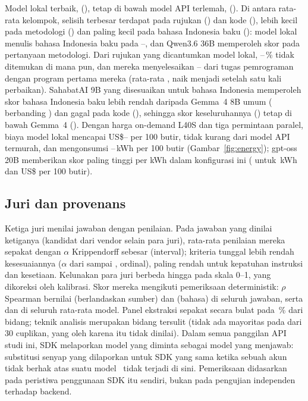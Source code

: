 Model lokal terbaik, \BestLocalName{} (\BestLocalScore{}), tetap di bawah model API terlemah, \WorstApiName{} (\WorstApiScore{}). Di antara rata-rata kelompok, selisih terbesar terdapat pada rujukan (\GapRef{}) dan kode (\GapCode{}), lebih kecil pada metodologi (\GapMeth{}) dan paling kecil pada bahasa Indonesia baku (\GapLang{}): model lokal menulis bahasa Indonesia baku pada \LocLangMin{}--\LocLangMax{}, dan Qwen3.6 36B memperoleh skor \TMethodologyQwenThreeSix{} pada pertanyaan metodologi. Dari rujukan yang dicantumkan model lokal, \NoneLocMin{}--\NoneLocMax{}\,\% tidak ditemukan di mana pun, dan mereka menyelesaikan \LocPassOneMin{}--\LocPassOneMax{} dari tugas pemrograman dengan program pertama mereka (rata-rata \LocPassOneMean{}, naik menjadi \LocRepairMean{} setelah satu kali perbaikan). SahabatAI 9B yang disesuaikan untuk bahasa Indonesia memperoleh skor bahasa Indonesia baku lebih rendah daripada Gemma~4 8B umum (\SahLang{} berbanding \GemmaFourLang{}) dan gagal pada kode (\SahCode{}), sehingga skor keseluruhannya (\SahOverall{}) tetap di bawah Gemma~4 (\GemmaFourOverall{}). Dengan harga on-demand L40S dan tiga permintaan paralel, biaya model lokal mencapai US\$\LocUSDMin{}--\LocUSDMax{} per 100 butir, tidak kurang dari model API termurah, dan mengonsumsi \LocKwhMin{}--\LocKwhMax{}\,kWh per 100 butir (Gambar~\ref{fig:energy}); gpt-oss 20B memberikan skor paling tinggi per kWh dalam konfigurasi ini (\ScoreGptOss{} untuk \KwhGptOss{}\,kWh dan US\$\UsdGptOss{} per 100 butir).

\subsection{Juri dan provenans}
Ketiga juri menilai \NJudgedAnswers{} jawaban dengan \NJudgeCalls{} penilaian. Pada \NAllJudges{} jawaban yang dinilai ketiganya (kandidat dari vendor selain para juri), rata-rata penilaian mereka sepakat dengan $\alpha$ Krippendorff sebesar \AlphaJudges{} (interval); kriteria tunggal lebih rendah kesesuaiannya ($\alpha$ dari \AlphaCritMin{} sampai \AlphaCritMax{}, ordinal), paling rendah untuk kepatuhan instruksi dan kesetiaan. Kelunakan para juri berbeda hingga \LeniencyRange{} pada skala 0--1, yang dikoreksi oleh kalibrasi. Skor mereka mengikuti pemeriksaan deterministik: $\rho$ Spearman bernilai \RhoAnsGrd{} (berlandaskan sumber) dan \RhoAnsLng{} (bahasa) di seluruh jawaban, serta \RhoModelGrd{} dan \RhoModelLng{} di seluruh rata-rata model. Panel ekstraksi sepakat secara bulat pada \SilverUnanimous{}\,\% dari bidang; teknik analisis merupakan bidang tersulit (tidak ada mayoritas pada \SilverAnalysisNone{} dari 30 cuplikan, yang oleh karena itu tidak dinilai). Dalam semua \NApiCalls{} panggilan API studi ini, SDK melaporkan model yang diminta sebagai model yang menjawab: substitusi senyap yang dilaporkan untuk SDK yang sama ketika sebuah akun tidak berhak atas suatu model~\cite{arya2026paperagent} tidak terjadi di sini. Pemeriksaan didasarkan pada peristiwa penggunaan SDK itu sendiri, bukan pada pengujian independen terhadap backend.
